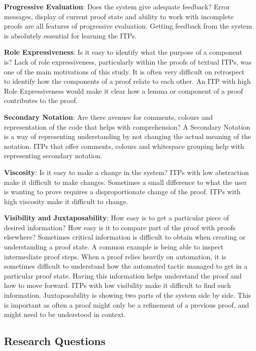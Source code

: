 \documentclass[
]{article}
\begin{document}
\textbf{Progressive Evaluation}: Does the system give adequate feedback?
Error messages, display of current proof state and ability to work with
incomplete proofs are all features of progressive evaluation. Getting
feedback from the system is absolutely essential for learning the ITPs.

\textbf{Role Expressiveness}: Is it easy to identify what the purpose of
a component is? Lack of role expressiveness, particularly within the
proofs of textual ITPs, was one of the main motivations of this study.
It is often very difficult on retrospect to identify how the components
of a proof relate to each other. An ITP with high Role Expressiveness
would make it clear how a lemma or component of a proof contributes to
the proof.

\textbf{Secondary Notation}: Are there avenues for comments, colours and
representation of the code that helps with comprehension? A Secondary
Notation is a way of representing understanding by not changing the
actual meaning of the notation. ITPs that offer comments, colours and
whitespace grouping help with representing secondary notation.

\textbf{Viscosity}: Is it easy to make a change in the system? ITPs with
low abstraction make it difficult to make changes. Sometimes a small
difference to what the user is wanting to prove requires a
disproportionate change of the proof. ITPs with high viscosity make it
difficult to change.

\textbf{Visibility and Juxtaposability}: How easy is to get a particular
piece of desired information? How easy is it to compare part of the
proof with proofs elsewhere? Sometimes critical information is difficult
to obtain when creating or understanding a proof state. A common example
is being able to inspect intermediate proof steps. When a proof relies
heavily on automation, it is sometimes difficult to understand how the
automated tactic managed to get in a particular proof state. Having this
information helps understand the proof and how to move forward. ITPs
with low visibility make it difficult to find such information.
Juxtaposability is showing two parts of the system side by side. This is
important as often a proof might only be a refinement of a previous
proof, and might need to be understood in context.

\hypertarget{research-questions}{%
\subsection{Research Questions}\label{research-questions}}
\end{document}
